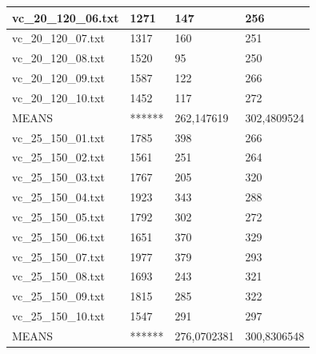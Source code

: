 \documentclass[11pt]{article}
\begin{document}
\begin{table}[!ht]
\begin{tabular}{|l|l|l|l|}
        vc\_20\_120\_06.txt & 1271 & 147 & 256 \\ \hline
        vc\_20\_120\_07.txt & 1317 & 160 & 251 \\ \hline
        vc\_20\_120\_08.txt & 1520 & 95 & 250 \\ \hline
        vc\_20\_120\_09.txt & 1587 & 122 & 266 \\ \hline
        vc\_20\_120\_10.txt & 1452 & 117 & 272 \\ \hline
        MEANS & ****** & 262,147619 & 302,4809524 \\ \hline
        vc\_25\_150\_01.txt & 1785 & 398 & 266 \\ \hline
        vc\_25\_150\_02.txt & 1561 & 251 & 264 \\ \hline
        vc\_25\_150\_03.txt & 1767 & 205 & 320 \\ \hline
        vc\_25\_150\_04.txt & 1923 & 343 & 288 \\ \hline
        vc\_25\_150\_05.txt & 1792 & 302 & 272 \\ \hline
        vc\_25\_150\_06.txt & 1651 & 370 & 329 \\ \hline
        vc\_25\_150\_07.txt & 1977 & 379 & 293 \\ \hline
        vc\_25\_150\_08.txt & 1693 & 243 & 321 \\ \hline
        vc\_25\_150\_09.txt & 1815 & 285 & 322 \\ \hline
        vc\_25\_150\_10.txt & 1547 & 291 & 297 \\ \hline
        MEANS & ****** & 276,0702381 & 300,8306548 \\ \hline
    \end{tabular}
\end{table}
\end{document}
